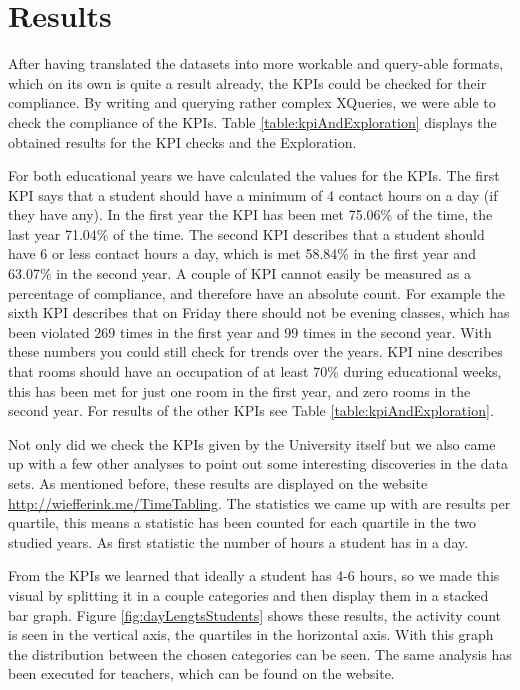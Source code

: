 \section{Results}
After having translated the datasets into more workable and query-able formats, which on its own is quite a result already, the KPIs could be checked for their compliance. By writing and querying rather complex XQueries, we were able to check the compliance of the KPIs. Table \ref{table:kpiAndExploration} displays the obtained results for the KPI checks and the Exploration.

For both educational years we have calculated the values for the KPIs. The first KPI says that a student should have a minimum of 4 contact hours on a day (if they have any). In the first year the KPI has been met 75.06\% of the time, the last year 71.04\% of the time. The second KPI describes that a student should have 6 or less contact hours a day, which is met 58.84\% in the first year and 63.07\% in the second year. A couple of KPI cannot easily be measured as a percentage of compliance, and therefore have an absolute count. For example the sixth KPI describes that on Friday there should not be evening classes, which has been violated 269 times in the first year and 99 times in the second year. With these numbers you could still check for trends over the years. KPI nine describes that rooms should have an occupation of at least 70\% during educational weeks, this has been met for just one room in the first year, and zero rooms in the second year. For results of the other KPIs see Table \ref{table:kpiAndExploration}.

Not only did we check the KPIs given by the University itself but we also came up with a few other analyses to point out some interesting discoveries in the data sets. As mentioned before, these results are displayed on the website \url{http://wiefferink.me/TimeTabling}. The statistics we came up with are results per quartile, this means a statistic has been counted for each quartile in the two studied years. As first statistic the number of hours a student has in a day. 

From the KPIs we learned that ideally a student has 4-6 hours, so we made this visual by splitting it in a couple categories and then display them in a stacked bar graph. Figure \ref{fig:dayLengtsStudents} shows these results, the activity count is seen in the vertical axis, the quartiles in the horizontal axis. With this graph the distribution between the chosen categories can be seen. The same analysis has been executed for teachers, which can be found on the website.

